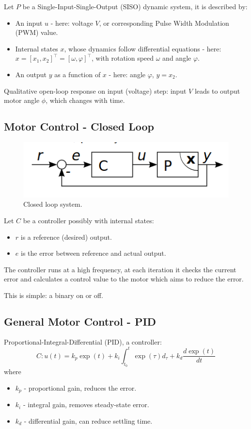 \documentclass[11pt]{article}
\begin{document}
Let $P$ be a Single-Input-Single-Output (SISO) dynamic system, it is described by:
\begin{itemize}
  \item An input $u$ - here: voltage $V$, or corresponding Pulse Width Modulation (PWM) value.
  \item Internal states $x$, whose dynamics follow differential equations - here: $x = [x_1, x_2]^\top = [\omega, \varphi]^\top$, with rotation speed $\omega$ and angle $\varphi$.
  \item An output $y$ as a function of $x$ - here: angle $\varphi$, $y = x_2$.
\end{itemize}

Qualitative open-loop response on input (voltage) step: input $V$ leads to output motor angle $\phi$, which changes with time.

\subsection{Motor Control - Closed Loop}
\begin{figure}[h]
  \caption{Closed loop system.}
  \includegraphics[scale=0.4]{closedloop}
  \centering
\end{figure}

Let $C$ be a controller possibly with internal states:
\begin{itemize}
  \item $r$ is a reference (desired) output.
  \item $e$ is the error between reference and actual output.
\end{itemize}

The controller runs at a high frequency, at each iteration it checks the current error and calculates a control value to the motor which aims to reduce the error.

This is simple: a binary on or off.

\subsection{General Motor Control - PID}
Proportional-Integral-Differential (PID), a controller:
\[
  C : u(t) = k_p \exp(t) + k_i \int_{t_0}^{t} \exp(\tau)d_\tau + k_d \frac{d\exp(t)}{dt}
\]
where
\begin{itemize}
  \item $k_p$ - proportional gain, reduces the error.
  \item $k_i$ - integral gain, removes steady-state error.
  \item $k_d$ - differential gain, can reduce settling time.
\end{itemize}
\end{document}
